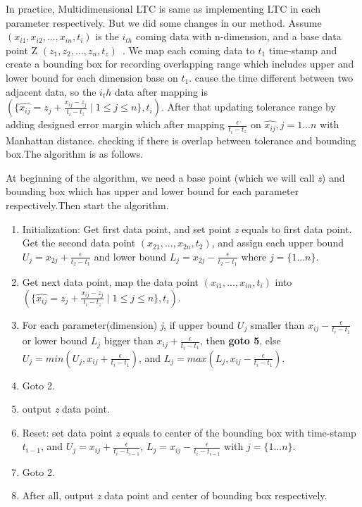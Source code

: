 \documentclass[10pt, conference, compsocconf]{IEEEtran}
\begin{document}
In practice, Multidimensional LTC is same as implementing LTC in each 
parameter respectively. But we did some changes in our method. Assume 
$(x_{i1}, x_{i2}, ..., x_{in},t_i)$ is the $i_{th}$ coming data with 
n-dimension, and a base data point Z  $(z_{1}, z_{2}, ..., 
z_{n},t_z)$~\cite{schoellhammer2004lightweight}. We map each coming 
data to $t_1$ time-stamp and create a bounding box for recording 
overlapping range which includes upper and lower bound for each 
dimension base on $t_1$. cause the time different between two adjacent 
data, so the $i_th$ data after mapping is $(\{\hat{x_{ij}}=z_j + 
\frac{x_{ij}-z_{j}}{t_i-t_z} \mid1\leqslant{j}\leqslant{n}\},t_i)$. 
After that updating tolerance range by adding designed error margin 
which after mapping $\frac{\epsilon}{t_i-t_z}$ on $\hat{x_{ij}}, 
j={1...n}$ with Manhattan distance. checking if there is overlap 
between tolerance and bounding box.The algorithm is as follows.

At beginning of the algorithm, we need a base point (which we will call 
\textit{z}) and bounding box which has upper and lower bound for each 
parameter respectively.Then start the algorithm.
\begin{enumerate}
  \item Initialization: Get first data point, and set point \textit{z} equals to first data point. Get the second data point $(x_{21},...,x_{2n},t_2)$, and assign each upper bound $U_j = x_{2j}+\frac{\epsilon}{t_2-t_1}$ and lower bound $L_j = x_{2j}-\frac{\epsilon}{t_2-t_1}$ where $j=\{1...n\}$.
  \item Get next data point, map the data point $(x_{i1},...,x_{in},t_i)$ into $(\{\hat{x_{ij}}=z_j + \frac{x_{ij}-z_{j}}{t_i-t_z} \mid1\leqslant{j}\leqslant{n}\},t_i)$.
  \item For each parameter(dimension) \textit{j}, if upper bound $U_j$ smaller than $x_{ij}-\frac{\epsilon}{t_i-t_1}$ or lower bound $L_j$ bigger than $x_{ij}+\frac{\epsilon}{t_i-t_1}$, then \textbf{goto 5}, else $U_j = min(U_j, x_{ij}+\frac{\epsilon}{t_i-t_1})$, and $L_j = max(L_j, x_{ij}-\frac{\epsilon}{t_i-t_1})$.
  \item Goto 2.
  \item output \textit{z} data point.
  \item Reset: set data point \textit{z} equals to center of the bounding box with time-stamp $t_{i-1}$, and $U_j=x_{ij}+\frac{\epsilon}{t_i-t_{i-1}}$, $L_j =x_{ij}-\frac{\epsilon}{t_i-t_{i-1}}$ with $j=\{1...n\}$.
  \item Goto 2.
  \item After all, output \textit{z} data point and center of bounding box respectively.
\end{enumerate}
\end{document}
